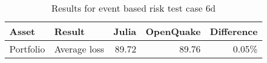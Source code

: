 \begin{table}[htbp]

\centering
\begin{tabular}{ l l r r r }

\hline
\rowcolor{anti-flashwhite}
\bf{Asset} & \bf{Result} & \bf{Julia} & \bf{OpenQuake} & \bf{Difference}\\
\hline
Portfolio & Average loss & 89.72 & 89.76 & 0.05\% \\
\hline
\end{tabular}

\caption{Results for event based risk test case 6d}
\label{tab:result-ebr-6d}
\end{table}